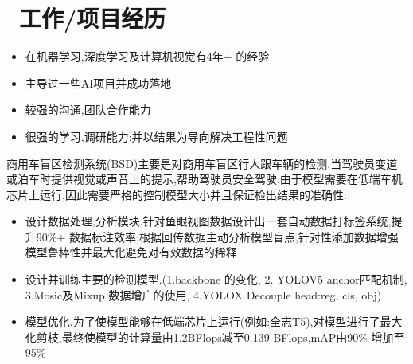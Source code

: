 \documentclass{resume}
\begin{document}



\section{\faUsers\ 工作/项目经历}
\role{Research Assistant}



\begin{itemize}
  \item 在机器学习,深度学习及计算机视觉有4年+ 的经验
  \item 主导过一些AI项目并成功落地
  \item 较强的沟通,团队合作能力
  \item 很强的学习,调研能力;并以结果为导向解决工程性问题
\end{itemize}

\begin{onehalfspacing}
商用车盲区检测系统(BSD)主要是对商用车盲区行人跟车辆的检测,当驾驶员变道或泊车时提供视觉或声音上的提示,帮助驾驶员安全驾驶.由于模型需要在低端车机芯片上运行,因此需要严格的控制模型大小并且保证检出结果的准确性.

\begin{itemize}
  \item 设计数据处理,分析模块.针对鱼眼视图数据设计出一套自动数据打标签系统,提升90\%+ 数据标注效率;根据回传数据主动分析模型盲点,针对性添加数据增强模型鲁棒性并最大化避免对有效数据的稀释
  \item 设计并训练主要的检测模型.(1.backbone 的变化, 2. YOLOV5 anchor匹配机制, 3.Mosic及Mixup 数据增广的使用, 4.YOLOX Decouple head:reg, cls, obj)
  \item 模型优化.为了使模型能够在低端芯片上运行(例如:全志T5),对模型进行了最大化剪枝,最终使模型的计算量由1.2BFlops减至0.139 BFlops,mAP由90\% 增加至 95\%
\end{itemize}
\end{onehalfspacing}
\end{document}
